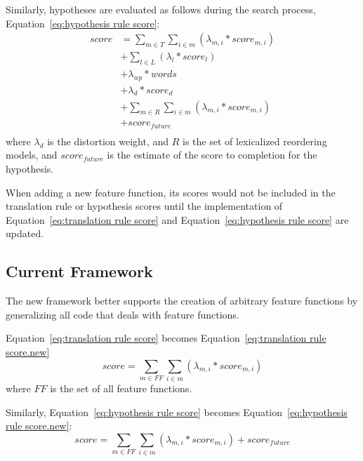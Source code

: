 \documentclass{pbml}
\begin{document}
Similarly, hypotheses are evaluated as follows during the search process, Equation~\ref{eq:hypothesis rule score}:
\begin{equation}
\begin{split}
 score & =  \sum_{m \in T} \sum_{i \in m} (\lambda_{m,i} * score_{m,i}) \\
    & + \sum_{l \in L} (\lambda_l * score_l) \\
    & + \lambda_{wp} * words \\
    & + \lambda_d * score_d \\
    & + \sum_{m \in R} \sum_{i \in m} (\lambda_{m,i} * score_{m,i})  \\
    & + score_{future} \\
\label{eq:hypothesis rule score}
\end{split}
\end{equation}
where $\lambda_d$ is the distortion weight, and $R$ is the set of lexicalized reordering models, and $score_{future}$ is the estimate of the score to completion for the hypothesis.

When adding a new feature function, its scores would not be included in the translation rule or hypothesis scores until the implementation of Equation~\ref{eq:translation rule score} and Equation~\ref{eq:hypothesis rule score} are updated.



\subsection{Current Framework}
The new framework better supports the creation of arbitrary feature functions by generalizing all code that deals with feature functions.

Equation~\ref{eq:translation rule score} becomes Equation~\ref{eq:translation rule score.new}
\begin{equation}
  score = \sum_{m \in FF} \sum_{i \in m} (\lambda_{m,i} * score_{m,i})
\label{eq:translation rule score.new}
\end{equation}
where $FF$ is the set of all feature functions.

Similarly, Equation~\ref{eq:hypothesis rule score} becomes Equation~\ref{eq:hypothesis rule score.new}:
\begin{equation}
  score =  \sum_{m \in FF} \sum_{i \in m} (\lambda_{m,i} * score_{m,i})
	  + score_{future}
\label{eq:hypothesis rule score.new}
\end{equation}
\end{document}
